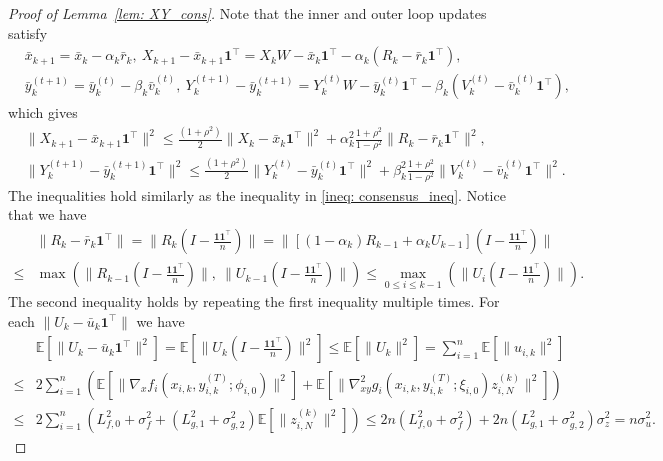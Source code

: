 \documentclass{article}
\theoremstyle{plain}
\theoremstyle{definition}
\theoremstyle{remark}
\newcommand{\E}{\mathbb{E}}
\newcommand{\bfone}{\mathbf{1}}
\newcommand{\bfonet}{\mathbf{1}^{\top}}
\begin{document}
\begin{proof}[Proof of Lemma~\ref{lem: XY_cons}]
    Note that the inner and outer loop updates satisfy
    \begin{align*}
        &\bar{x}_{k+1} = \bar{x}_k - \alpha_k \bar{r}_k,\ X_{k+1} - \bar{x}_{k+1}\bfonet = X_kW - \bar{x}_k\bfonet - \alpha_k(R_k - \bar{r}_k\bfonet), \\
        &\bar{y}_k^{(t+1)} = \bar{y}_k^{(t)} - \beta_k\bar{v}_k^{(t)},\ Y_{k}^{(t+1)} - \bar{y}_k^{(t+1)} = Y_k^{(t)}W - \bar{y}_k^{(t)}\bfonet - \beta_k(V_k^{(t)} - \bar{v}_k^{(t)}\bfonet),
    \end{align*}
    which gives
    \begin{align}
        &\|X_{k+1} - \bar{x}_{k+1}\bfonet\|^2 \leq \frac{(1+\rho^2)}{2}\|X_k - \bar{x}_k\bfonet\|^2 + \alpha_k^2\frac{1+\rho^2}{1-\rho^2}\|R_k - \bar{r}_k\bfonet\|^2, \label{ineq: X_cons_recursion}\\
        &\|Y_{k}^{(t+1)} - \bar{y}_{k}^{(t+1)}\bfonet\|^2 \leq \frac{(1+\rho^2)}{2}\|Y_k^{(t)} - \bar{y}_k^{(t)}\bfonet\|^2 + \beta_k^2\frac{1+\rho^2}{1-\rho^2}\|V_k^{(t)} - \bar{v}_k^{(t)}\bfonet\|^2. \label{ineq: Y_cons_recursion}
    \end{align}
    The inequalities hold similarly as the inequality in \eqref{ineq: consensus_ineq}. Notice that we have
    \begin{align*}
        &\|R_k - \bar{r}_k\bfonet\| = \|R_k\left(I - \frac{\bfone\bfonet}{n}\right)\| = \|\left[(1-\alpha_k)R_{k-1} + \alpha_kU_{k-1}\right]\left(I-\frac{\bfone\bfonet}{n}\right)\|\\
        \leq &\max\left(\|R_{k-1}\left(I-\frac{\bfone\bfonet}{n}\right)\|,\ \|U_{k-1}\left(I-\frac{\bfone\bfonet}{n}\right)\|\right)\leq \max_{0\leq i\leq k-1}\left(\|U_{i}\left(I-\frac{\bfone\bfonet}{n}\right)\|\right).
    \end{align*}
    The second inequality holds by repeating the first inequality multiple times. For each $\|U_k - \bar{u}_k\bfonet\|$ we have
    \begin{align*}
        &\E\left[\|U_k - \bar{u}_k\bfonet\|^2\right] = \E\left[\|U_k\left(I - \frac{\bfone\bfonet}{n}\right)\|^2\right]\leq \E\left[\|U_k\|^2\right] = \sum_{i=1}^{n}\E\left[\|u_{i,k}\|^2\right] \\
        \leq &2\sum_{i=1}^{n}\left(\E\left[\|\nabla_xf_i(x_{i,k}, y_{i,k}^{(T)};\phi_{i,0})\|^2\right] + \E\left[\|\nabla_{xy}^2 g_i(x_{i,k},y_{i,k}^{(T)};\xi_{i,0} )z_{i,N}^{(k)}\|^2\right]\right)\\
        \leq &2\sum_{i=1}^{n}\left(L_{f,0}^2 + \sigma_f^2 + (L_{g,1}^2 + \sigma_{g,2}^2)\E\left[\|z_{i,N}^{(k)}\|^2\right]\right) \leq 2n(L_{f,0}^2 + \sigma_f^2) + 2n(L_{g,1}^2 + \sigma_{g,2}^2)\sigma_z^2 = n\sigma_u^2.

\end{align*}
\end{proof}
\end{document}
